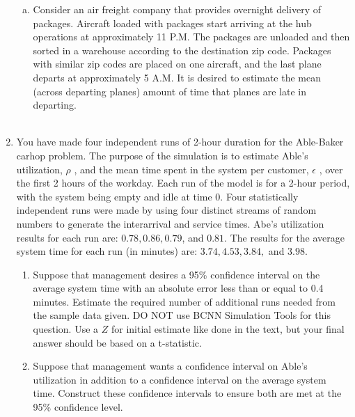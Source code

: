 \documentclass[12pt]{amsart}
\begin{document}
\begin{enumerate}[1.]
\begin{enumerate}[a.]
	\item Consider an air freight company that provides overnight delivery of packages. Aircraft
	loaded with packages start arriving at the hub operations at approximately 11 P.M. The
	packages are unloaded and then sorted in a warehouse according to the destination zip code.
	Packages with similar zip codes are placed on one aircraft, and the last plane departs at
	approximately 5 A.M. It is desired to estimate the mean (across departing planes) amount
	of time that planes are late in departing. \\
	
	\textit{}\\
	
\end{enumerate}

\item You have made four independent runs of 2-hour duration for the Able-Baker carhop problem.
The purpose of the simulation is to estimate Able’s utilization, \(\rho\) , and the mean time spent in
the system per customer, \(\epsilon\) , over the first 2 hours of the workday. Each run of the model is for
a 2-hour period, with the system being empty and idle at time 0. Four statistically independent
runs were made by using four distinct streams of random numbers to generate the interarrival
and service times. Abe’s utilization results for each run are: \(0.78, 0.86, 0.79\), and \(0.81\). The
results for the average system time for each run (in minutes) are: \(3.74, 4.53, 3.84,\) and \(3.98\). \\

\begin{enumerate}
	\item Suppose that management desires a 95\% confidence interval on the average system time
	with an absolute error less than or equal to 0.4 minutes. Estimate the required number of
	additional runs needed from the sample data given. DO NOT use BCNN Simulation Tools
	for this question. Use a \(Z\) for initial estimate like done in the text, but your final answer
	should be based on a t-statistic. \\
	
	\item Suppose that management wants a confidence interval on Able’s utilization in addition to a
	confidence interval on the average system time. Construct these confidence intervals to
	ensure both are met at the 95\% confidence level. \\
	
	
\end{enumerate}



\end{enumerate}
	
\end{document}
